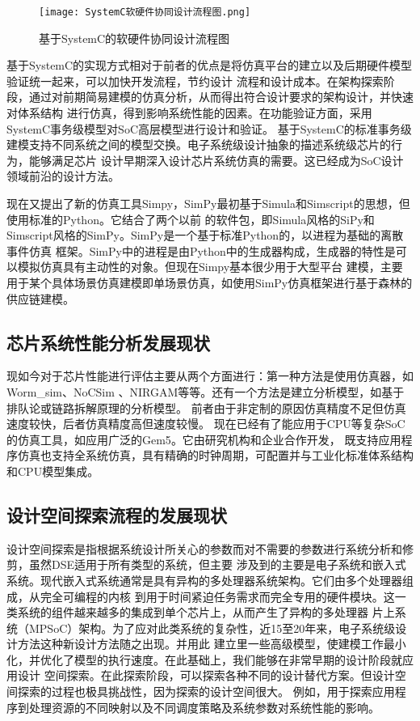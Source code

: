 \begin{figure}
    \centering
    \texttt{[image: SystemC软硬件协同设计流程图.png]}
    \caption{基于SystemC的软硬件协同设计流程图}
    \label{fig:badge}
\end{figure}

基于SystemC的实现方式相对于前者的优点是将仿真平台的建立以及后期硬件模型验证统一起来，可以加快开发流程，节约设计
流程和设计成本。在架构探索阶段，通过对前期简易建模的仿真分析，从而得出符合设计要求的架构设计，并快速对体系结构
进行仿真，得到影响系统性能的因素。在功能验证方面，采用SystemC事务级模型对SoC高层模型进行设计和验证\cite{8}。
基于SystemC的标准事务级建模支持不同系统之间的模型交换。电子系统级设计抽象的描述系统级芯片的行为，能够满足芯片
设计早期深入设计芯片系统仿真的需要\cite{9}。这已经成为SoC设计领域前沿的设计方法。

现在又提出了新的仿真工具Simpy，SimPy最初基于Simula和Simscript的思想，但使用标准的Python。它结合了两个以前
的软件包，即Simula风格的SiPy和Simscript风格的SimPy。SimPy是一个基于标准Python的，以进程为基础的离散事件仿真
框架。SimPy中的进程是由Python中的生成器构成，生成器的特性是可以模拟仿真具有主动性的对象。但现在Simpy基本很少用于大型平台
建模，主要用于某个具体场景仿真建模即单场景仿真\cite{10}，如使用SimPy仿真框架进行基于森林的供应链建模\cite{11}。

\subsection{芯片系统性能分析发展现状}
现如今对于芯片性能进行评估主要从两个方面进行：第一种方法是使用仿真器，如Worm\_sim、NoCSim
、NIRGAM等等。还有一个方法是建立分析模型，如基于排队论或链路拆解原理的分析模型\cite{39}。
前者由于非定制的原因仿真精度不足但仿真速度较快，后者仿真精度高但速度较慢。
现在已经有了能应用于CPU等复杂SoC的仿真工具，如应用广泛的Gem5\cite{12}。它由研究机构和企业合作开发，
既支持应用程序仿真也支持全系统仿真，具有精确的时钟周期，可配置并与工业化标准体系结构和CPU模型集成。
\subsection{设计空间探索流程的发展现状}
设计空间探索是指根据系统设计所关心的参数而对不需要的参数进行系统分析和修剪\cite{13}，虽然DSE适用于所有类型的系统，但主要
涉及到的主要是电子系统和嵌入式系统。现代嵌入式系统通常是具有异构的多处理器系统架构。它们由多个处理器组成，从完全可编程的内核
到用于时间紧迫任务需求而完全专用的硬件模块。这一类系统的组件越来越多的集成到单个芯片上，从而产生了异构的多处理器
片上系统（MPSoC）架构\cite{14}。为了应对此类系统的复杂性，近15至20年来，电子系统级设计方法这种新设计方法随之出现。并用此
建立里一些高级模型，使建模工作最小化，并优化了模型的执行速度。在此基础上，我们能够在非常早期的设计阶段就应用设计
空间探索。在此探索阶段，可以探索各种不同的设计替代方案。但设计空间探索的过程也极具挑战性，因为探索的设计空间很大。
例如，用于探索应用程序到处理资源的不同映射\cite{15}以及不同调度策略及系统参数对系统性能的影响。

